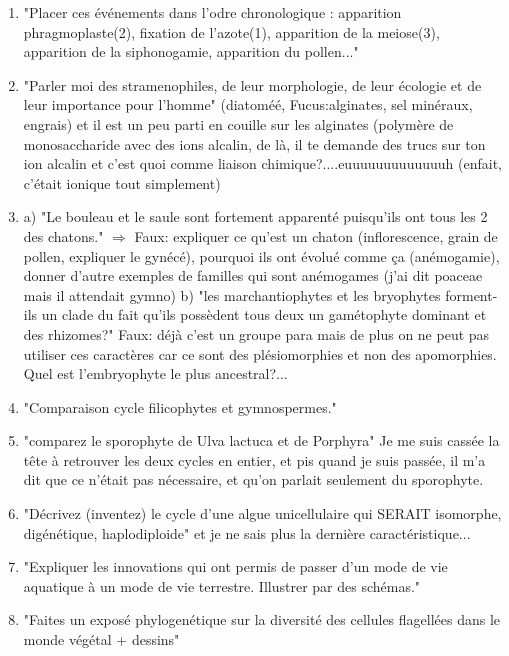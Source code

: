 \begin{enumerate}
	\item "Placer ces événements dans l'odre chronologique : apparition phragmoplaste(2), fixation de l'azote(1), apparition de la meiose(3), apparition de la siphonogamie, apparition du pollen..."


	\item "Parler moi des stramenophiles, de leur morphologie, de leur écologie et de leur importance pour l'homme" (diatoméé, Fucus:alginates, sel minéraux, engrais) et il est un peu parti en couille sur les alginates (polymère de monosaccharide avec des ions alcalin, de là, il te demande des trucs sur ton ion alcalin et c'est quoi comme liaison chimique?....euuuuuuuuuuuuuh (enfait, c'était ionique tout simplement)

	\item a) "Le bouleau et le saule sont fortement apparenté puisqu'ils ont tous les 2 des chatons." $\Rightarrow$  Faux: expliquer ce qu'est un chaton (inflorescence, grain de pollen, expliquer le gynécé), pourquoi ils ont évolué comme ça (anémogamie), donner d'autre exemples de familles qui sont anémogames (j'ai dit poaceae mais il attendait gymno)
b) "les marchantiophytes et les bryophytes forment-ils un clade du fait qu'ils possèdent tous deux un gamétophyte dominant et des rhizomes?" Faux: déjà c'est un groupe para mais de plus on ne peut pas utiliser ces caractères car ce sont des plésiomorphies et non des apomorphies. Quel est l'embryophyte le plus ancestral?...

	\item "Comparaison cycle filicophytes et gymnospermes."

	\item "comparez le sporophyte de Ulva lactuca et de Porphyra" 
Je me suis cassée la tête à retrouver les deux cycles en entier, et pis quand je suis passée, il m’a dit que ce n'était pas nécessaire, et qu'on parlait seulement du sporophyte.

	\item "Décrivez (inventez) le cycle d'une algue unicellulaire qui SERAIT  isomorphe,
digénétique, haplodiploide" et je ne sais plus la dernière caractéristique...

	\item "Expliquer les innovations qui ont permis de passer d'un mode de vie aquatique à un mode de vie terrestre. Illustrer par des schémas."

	\item "Faites un exposé phylogenétique sur la diversité des cellules flagellées dans le monde végétal + dessins"


\end{enumerate}

